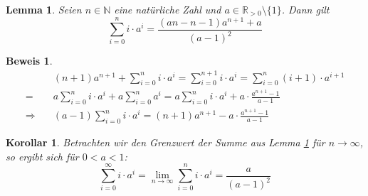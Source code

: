 \documentclass[a4paper]{article}
\newtheorem{korollar}[satz]{Korollar}
\newtheorem{lemma}[satz]{Lemma}
\theoremstyle{nonumberplain}
\newtheorem{beweis}{Beweis}
\begin{document}
	\begin{lemma} \label{lem-infsum}
		Seien $n \in \mathbb{N}$ eine natürliche Zahl und $a \in \mathbb{R}_{>0}\setminus\{1\}$. Dann gilt
		\begin{equation}
		\sum_{i=0}^{n}{i\cdot a^i} = \frac{(an-n-1)a^{n+1}+a}{(a-1)^2}
		\end{equation}
	\end{lemma}
	\begin{beweis}
		\begin{align*}
		&(n+1) a^{n+1} + \sum_{i=0}^{n}{i\cdot a^i} = \sum_{i=0}^{n+1}{i\cdot a^i} = \sum_{i=0}^{n}{(i+1)\cdot a^{i+1}} \\
		=& a \sum_{i=0}^{n}{i\cdot a^{i}} + a \sum_{i=0}^{n}{a^{i}} = a \sum_{i=0}^{n}{i\cdot a^{i}} + a \cdot \frac{a^{n+1}-1}{a-1}\\
		\Rightarrow \quad & (a-1) \sum_{i=0}^{n}{i\cdot a^i} = (n+1) a^{n+1} - a \cdot \frac{a^{n+1}-1}{a-1} 
		\end{align*}
	\end{beweis}
	\begin{korollar} \label{kor-infsum}
		Betrachten wir den Grenzwert der Summe aus Lemma \ref{lem-infsum} für $n \to \infty$, so ergibt sich für $0<a<1$:
		\begin{equation}
		\sum_{i=0}^{\infty}{i\cdot a^i}
		= \lim\limits_{n \to \infty} \sum_{i=0}^{n}{i\cdot a^i}
		= \frac{a}{(a-1)^2}
		\end{equation}
	\end{korollar}
	
\end{document}
